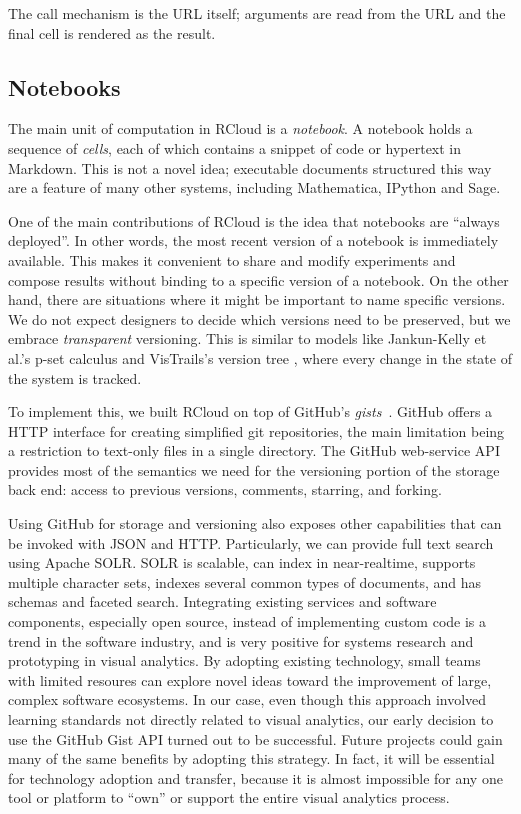 The call mechanism is the URL itself; arguments are read from the URL
and the final cell is rendered as the result.

\subsection{Notebooks\label{sec:notebooks}}

The main unit of computation in RCloud is a \emph{notebook}.
A notebook holds a sequence of \emph{cells}, each of which contains a
snippet of code or hypertext in Markdown. This is not a novel idea;
executable documents structured this way are a feature of many
other systems, including Mathematica, IPython and Sage.

One of the main contributions of RCloud is the idea that notebooks
are ``always deployed''. In other words, the most recent version of
a notebook is immediately available.
This makes it convenient to share and modify experiments and compose
results without binding to a specific version of a notebook.
On the other hand, there are situations where it might be important
to name specific versions. We do not expect designers to decide which
versions need to be preserved, but we embrace \emph{transparent} versioning.
This is similar to models like Jankun-Kelly et al.'s p-set calculus \cite{Jankun-Kelly:2007:MFV}
and VisTrails's version tree \cite{Callahan:2006:VVM}, where every change in the state of the system is tracked.

To implement this, we built RCloud on top of GitHub's \emph{gists}~\cite{GitHub:2014:GG}.
GitHub offers a HTTP interface for creating simplified git repositories, the main limitation
being a restriction to text-only files in a single directory. The GitHub web-service
API provides most of the semantics we need for the versioning portion of the storage back end:
access to previous versions, comments, starring, and forking.

Using GitHub for storage and versioning also exposes other capabilities
that can be invoked with JSON and HTTP.
Particularly, we can provide full text search using Apache SOLR.
SOLR is scalable, can index in near-realtime, supports multiple character sets,
indexes several common types of documents, and has schemas and faceted search.
%
Integrating existing services and software components, especially open source,
instead of implementing custom code is a trend in the software industry, and
is very positive for systems research and prototyping in visual analytics.
By adopting existing technology, small teams with limited resoures can explore
novel ideas toward the improvement of large, complex software ecosystems.
In our case, even though this approach involved learning standards not directly
related to visual analytics, our early decision to use the GitHub Gist API
turned out to be successful. Future projects could gain many of the same benefits
by adopting this strategy. In fact, it will be essential for technology adoption
and transfer, because it is almost impossible for any one tool or platform to
``own'' or support the entire visual analytics process.

